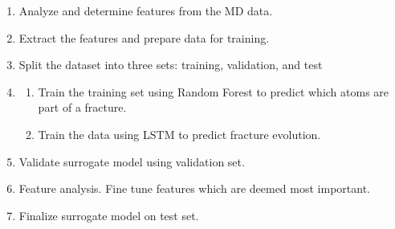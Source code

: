 \begin{enumerate}
    \item Analyze and determine features from the MD data.
    \item Extract the features and prepare data for training.
    \item Split the dataset into three sets: training, validation, and test
    \item
    \begin{enumerate}
        \item Train the training set using Random Forest to predict which atoms are part of a fracture.
        \item Train the data using LSTM to predict fracture evolution.
    \end{enumerate}
    \item Validate surrogate model using validation set.
    \item Feature analysis. Fine tune features which are deemed most important. 
    \item Finalize surrogate model on test set. 
\end{enumerate}